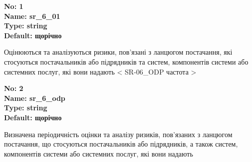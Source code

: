 \documentclass{article}
\begin{document}
\vspace{10pt}
{\footnotesize\bfseries
No: 1\\
Name: sr\_\allowbreak{}6\_\allowbreak{}01\\
Type: string\\
Default: \textquotedbl{}щорічно\textquotedbl{}
}

{\footnotesize Оцінюються та аналізуються ризики, пов'язані з ланцюгом постачання, які стосуються постачальників або підрядників та систем, компонентів системи або системних послуг, які вони надають < SR-06\_\allowbreak{}ODP частота >}


{\footnotesize\bfseries
No: 2\\
Name: sr\_\allowbreak{}6\_\allowbreak{}odp\\
Type: string\\
Default: \textquotedbl{}щорічно\textquotedbl{}
}

{\footnotesize Визначена періодичність оцінки та аналізу ризиків, пов'язаних з ланцюгом постачання, що стосуються постачальників або підрядників, а також систем, компонентів системи або системних послуг, які вони надають}
\end{document}
